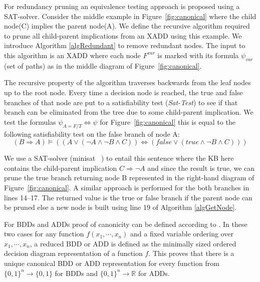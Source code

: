 \documentclass[twoside,11pt]{article}
\begin{document}
For redundancy pruning an equivalence testing approach  is proposed using a SAT-solver. Consider the middle example in Figure~\ref{fig:canonical} where the child node(C) implies the parent node(A). We define the recursive algorithm required to prune all child-parent implications from an XADD using this example. We introduce Algorithm \ref{algRedundant} to remove redundant nodes. 
The input to this algorithm is an XADD where each node $F^{var}$ is marked with its formula $\psi_{var}$ (set of paths) as in the middle diagram of Figure~\ref{fig:canonical}. 

The recursive property of the algorithm traverses backwards from the leaf nodes up to the root node. Every time a decision node is reached, the true and false branches of that node are put to a satisfiability test (\emph{Sat-Test}) to see if that branch can be eliminated from the tree due to some child-parent implication. %
We test the formulas $\psi_{A=F/T} \Longleftrightarrow \psi$ for Figure~\ref{fig:canonical} this is equal to the following satisfiability test on the false branch of node A: 
\begin{equation*}
(B \Rightarrow A) \models ((A \vee (\neg A \wedge \neg B \wedge C))\Longleftrightarrow(\mathit{false} \vee (\mathit{true} \wedge \neg B \wedge C)))
\end{equation*}

We use a SAT-solver (minisat ~\cite{minisat}) to entail this sentence where the KB here contains the child-parent implication $C \Rightarrow \neg A$  and since the result is true, we can prune the true branch returning node B represented in the right-hand diagram of  Figure~\ref{fig:canonical}. A similar approach is performed for the both branches in lines 14--17. The returned value is the true or false branch if the parent node can be pruned else a new node is built using line 19 of Algorithm \ref{algGetNode}. 

For BDDs and ADDs proof of canonicity can be defined according to \cite{bryant}. In these two cases for any function $f(x_1,\cdots, x_n)$ and a fixed variable ordering over $x_1,\cdots, x_n$, a reduced BDD or ADD is defined as the minimally sized ordered decision diagram representation of a function $f$. This proves that there is a unique canonical BDD or ADD representation for every function from $\{0,1\}^{n} \rightarrow \{0,1\}$ for BDDs and $\{0,1\}^{n} \rightarrow \mathbb{R}$ for ADDs. 
\end{document}
